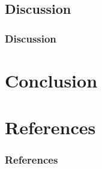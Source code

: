 \documentclass[11pt, aspectratio=1610, xcolor={dvipsnames}]{beamer}
\begin{document}
	\subsection{Discussion}
	\begin{frame}
		\frametitle{Discussion}
	\end{frame}
	
	\section{Conclusion}
	\begin{frame}
		\frametitle{}
	\end{frame}
	
	\section*{References}
	\begin{frame}[allowframebreaks]
		\frametitle{References}
		
		
		
	\end{frame}
	
\end{document}
